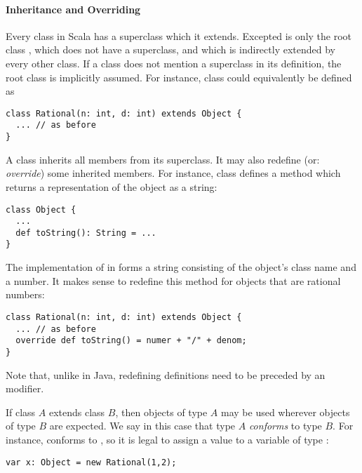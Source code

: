 \documentclass[a4paper,12pt,twoside,titlepage]{book}
\begin{document}
\paragraph{Inheritance and Overriding}
Every class in Scala has a superclass which it extends.
Excepted is only the root class , which does not have a
superclass, and which is indirectly extended by every other class.
If a class does not mention a superclass in its definition, the root
class  is implicitly assumed. For instance, class
 could equivalently be defined as
\begin{lstlisting}
class Rational(n: int, d: int) extends Object {
  ... // as before
}
\end{lstlisting}
A class inherits all members from its superclass. It may also redefine
(or: {\em override}) some inherited members. For instance, class
 defines
a method
 which returns a representation of the object as a string:
\begin{lstlisting}
class Object {
  ...
  def toString(): String = ...
}
\end{lstlisting}
The implementation of  in 
forms a string consisting of the object's class name and a number. It
makes sense to redefine this method for objects that are rational
numbers:
\begin{lstlisting}
class Rational(n: int, d: int) extends Object {
  ... // as before
  override def toString() = numer + "/" + denom;
}
\end{lstlisting}
Note that, unlike in Java, redefining definitions need to be preceded
by an  modifier.

If class $A$ extends class $B$, then objects of type $A$ may be used
wherever objects of type $B$ are expected. We say in this case that
type $A$ {\em conforms} to type $B$.  For instance, 
conforms to , so it is legal to assign a 
value to a variable of type :
\begin{lstlisting}
var x: Object = new Rational(1,2);
\end{lstlisting}
\end{document}
